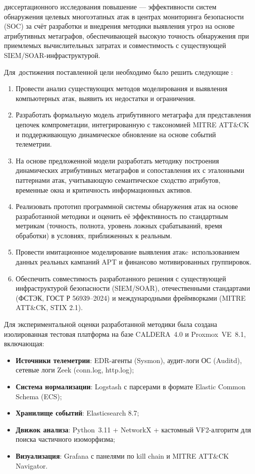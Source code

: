 {\aim} диссертационного исследования повышение — эффективности систем обнаружения целевых многоэтапных атак в центрах мониторинга безопасности (SOC) за счёт разработки и внедрения методики выявления угроз на основе атрибутивных метаграфов, обеспечивающей высокую точность обнаружения при приемлемых вычислительных затратах и совместимость с существующей SIEM/SOAR-инфраструктурой.


Для~достижения поставленной цели необходимо было решить следующие {\tasks}:

\begin{enumerate}[beginpenalty=10000] %
    \item Провести анализ существующих методов моделирования и выявления компьютерных атак, выявить их недостатки и ограничения.
    \item Разработать формальную модель атрибутивного метаграфа для представления цепочек компрометации, интегрированную с таксономией MITRE ATT\&CK и поддерживающую динамическое обновление на основе событий телеметрии.
    \item На основе предложенной модели разработать методику построения динамических атрибутивных метаграфов и сопоставления их с эталонными паттернами атак, учитывающую семантическое сходство атрибутов, временные окна и критичность информационных активов.
    \item Реализовать прототип программной системы обнаружения атак на основе разработанной методики и оценить её эффективность по стандартным метрикам (точность, полнота, уровень ложных срабатываний, время обработки) в условиях, приближенных к реальным.
    \item Провести имитационное моделирование выявления атак\linebreak c~использованием данных реальных кампаний APT и финансово мотивированных группировок.
    \item Обеспечить совместимость разработанного решения с существующей инфраструктурой безопасности (SIEM/SOAR), отечественными стандартами (ФСТЭК, ГОСТ Р 56939–2024) и международными фреймворками (MITRE ATT\&CK, STIX 2.1).
\end{enumerate}

Для экспериментальной оценки разработанной методики была создана изолированная тестовая платформа на базе CALDERA~4.0 и Proxmox~VE~8.1, включающая:
\begin{itemize}
    \item \textbf{Источники телеметрии}: EDR-агенты (Sysmon), аудит-логи ОС (Auditd), сетевые логи Zeek (conn.log, http.log);
    \item \textbf{Система нормализации}: Logstash с парсерами в формате Elastic Common Schema (ECS);
    \item \textbf{Хранилище событий}: Elasticsearch 8.7;
    \item \textbf{Движок анализа}: Python~3.11 + NetworkX + кастомный VF2-алгоритм для поиска частичного изоморфизма;
    \item \textbf{Визуализация}: Grafana с панелями по kill chain и MITRE ATT\&CK Navigator.
\end{itemize}


